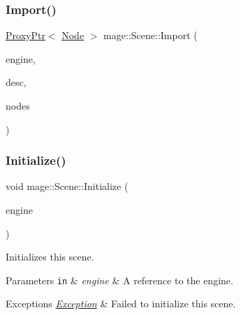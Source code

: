 \hypertarget{classmage_1_1_scene_ac3ac7fd6eb1e6f59626b65f3da8553a4}{}\label{classmage_1_1_scene_ac3ac7fd6eb1e6f59626b65f3da8553a4} 
\subsubsection{\texorpdfstring{Import()}{Import()}\hspace{0.1cm}{\footnotesize\ttfamily [2/2]}}
{\footnotesize\ttfamily \hyperlink{classmage_1_1_proxy_ptr}{Proxy\+Ptr}$<$ \hyperlink{classmage_1_1_node}{Node} $>$ mage\+::\+Scene\+::\+Import (\begin{DoxyParamCaption}\item[{\hyperlink{classmage_1_1_engine}{Engine} \&}]{engine,  }\item[{const \hyperlink{classmage_1_1rendering_1_1_model_descriptor}{rendering\+::\+Model\+Descriptor} \&}]{desc,  }\item[{std\+::vector$<$ \hyperlink{classmage_1_1_proxy_ptr}{Proxy\+Ptr}$<$ \hyperlink{classmage_1_1_node}{Node} $>$ $>$ \&}]{nodes }\end{DoxyParamCaption})}

\hypertarget{classmage_1_1_scene_a0edb77d5e45bd1822793d189a45fbb5c}{}\label{classmage_1_1_scene_a0edb77d5e45bd1822793d189a45fbb5c} 
\subsubsection{\texorpdfstring{Initialize()}{Initialize()}}
{\footnotesize\ttfamily void mage\+::\+Scene\+::\+Initialize (\begin{DoxyParamCaption}\item[{\hyperlink{classmage_1_1_engine}{Engine} \&}]{engine }\end{DoxyParamCaption})}

Initializes this scene.


\begin{DoxyParams}[1]{Parameters}
\mbox{\tt in}  & {\em engine} & A reference to the engine. \\
\hline
\end{DoxyParams}

\begin{DoxyExceptions}{Exceptions}
{\em \hyperlink{classmage_1_1_exception}{Exception}} & Failed to initialize this scene. \\
\hline
\end{DoxyExceptions}
\hypertarget{classmage_1_1_scene_a02ec2f7b43fd7050bc41eb7d89d4baba}{}\label{classmage_1_1_scene_a02ec2f7b43fd7050bc41eb7d89d4baba} 
